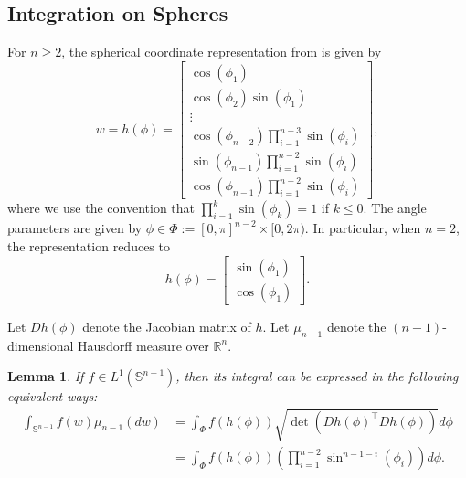 \documentclass[twoside]{article}
\newtheorem{lemma}{Lemma}
\theoremstyle{definition}
\newcommand{\R}{\mathbb{R}}
\renewcommand{\S}{\mathbb{S}}
\newcommand{\1}[1]{\scalebox{1.25}{$\mathds{1}$}\left[#1\right]}
\begin{document}
\subsection{Integration on Spheres}

For $n\ge 2$, the spherical coordinate representation from \cite{blumenson1960derivation} is given by
\begin{equation}
\label{eq:spherical}
w=h(\phi)=\begin{bmatrix}
\cos(\phi_1) \\
\cos(\phi_2)\sin(\phi_1) \\
\vdots \\
\cos(\phi_{n-2})\prod_{i=1}^{n-3}\sin(\phi_i) \\
\sin(\phi_{n-1})\prod_{i=1}^{n-2}\sin(\phi_i)\\
\cos(\phi_{n-1})\prod_{i=1}^{n-2}\sin(\phi_i)
\end{bmatrix},
\end{equation}
where we use the convention that $\prod_{i=1}^k\sin(\phi_k)=1$ if $k\le 0.$ The angle parameters are given by $\phi \in \Phi:=[0,\pi]^{n-2}\times [0,2\pi)$. In particular, when $n=2$, the representation reduces to 
$$
h(\phi)=\begin{bmatrix}
\sin(\phi_1)\\
\cos(\phi_1)
\end{bmatrix}.
$$

Let $Dh(\phi)$ denote the Jacobian matrix of $h$. Let $\mu_{n-1}$ denote the $(n-1)$-dimensional Hausdorff measure over $\R^n$.

\begin{lemma}
\label{lem:coordinateIntegral}
If $f\in L^1(\S^{n-1})$, then its integral can be expressed in the following equivalent ways:
\begin{align*}
\int_{\S^{n-1}}f(w)\mu_{n-1}(dw)&=\int_{\Phi}
f(h(\phi))\sqrt{\det(Dh(\phi)^\top Dh(\phi))}d\phi \\
&=\int_{\Phi}f(h(\phi))\left(\prod_{i=1}^{n-2}\sin^{n-1
-i}(\phi_i)\right)d\phi.
\end{align*}
\end{lemma}
\end{document}
